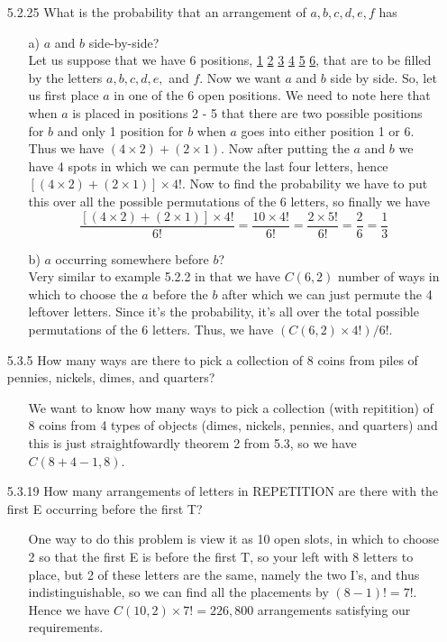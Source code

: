 \documentclass[12pt]{article}
\newcommand{\un}[1]{\underline{#1}}
\begin{document}
\begin{enumerate}
\item[5.2.25] What is the probability that an arrangement of $a, b, c, d, e, f$ has
\begin{enumerate}
\item[a)] $a$ and $b$ side-by-side? \\ 
Let us suppose that we have 6 positions, \un{1} \un{2} \un{3} \un{4} \un{5} \un{6}, 
that are to be filled by the letters $a, b, c, d, e,$ and $f$. Now we want $a$ and $b$ side by side. 
So, let us first place $a$ in one of the 6 open positions. We need to note here that when $a$ is
placed in positions 2 - 5 that there are two possible positions for $b$ and only 1 position for $b$ when
$a$ goes into either position 1 or 6. Thus we have $(4 \times 2) + (2 \times 1)$. Now after putting the
$a$ and $b$ we have 4 spots in which we can permute the last four letters, hence $[(4 \times 2) +
(2 \times 1)] \times 4!$. Now to find the probability we have to put this over all the possible
permutations of the 6 letters, so finally we have 
\[
\frac{[(4 \times 2) + (2 \times 1)] \times 4!}{6!} = \frac{10 \times 4!}{6!} =
\frac{2 \times 5!}{6!} = \frac{2}{6} = \frac{1}{3}
\]
\item[b)] $a$ occurring somewhere before $b$? \\
Very similar to example 5.2.2 in that we have $C(6, 2)$ number of ways in which to choose the
$a$ before the $b$ after which we can just permute the 4 leftover letters. Since it's the probability, it's
all over the total possible permutations of the 6 letters. Thus, we have $(C(6, 2) \times 4!)/6!$.
\end{enumerate}

\item[5.3.5] How many ways are there to pick a collection of 8 coins from piles of pennies, nickels, dimes, and quarters?
\begin{enumerate}
\item[] We want to know how many ways to pick a collection (with repitition) of 8 coins from 4 types of objects 
(dimes, nickels, pennies, and quarters) and this is just straightfowardly theorem 2 from 5.3, so we have
$C(8 + 4 - 1, 8)$.
\end{enumerate}

\item[5.3.19] How many arrangements of letters in REPETITION are there with the first E occurring before the first T?
\begin{enumerate}
\item[] One way to do this problem is view it as 10 open slots, in which to choose 2 so that the first E is before
the first T, so your left with 8 letters to place, but 2 of these letters are the same, namely the two I's, 
and thus indistinguishable, so we can find all the placements by $(8 - 1)! = 7!$. Hence we have 
$C(10, 2) \times 7! = 226,800$ arrangements satisfying our requirements.
\end{enumerate}


\end{enumerate}
\end{document}
